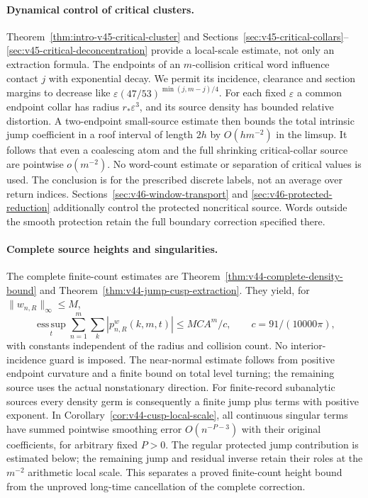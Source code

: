 \documentclass[11pt,reqno]{amsart}
\numberwithin{equation}{section}
\theoremstyle{definition}\newtheorem{definition}[theorem]{Definition}
\theoremstyle{remark}\newtheorem{remark}[theorem]{Remark}
\begin{document}
\paragraph{Dynamical control of critical clusters.}
Theorem~\ref{thm:intro-v45-critical-cluster} and
Sections~\ref{sec:v45-critical-collars}--\ref{sec:v45-critical-deconcentration}
provide a local-scale estimate, not only an extraction formula.
The endpoints of an $m$-collision critical word influence contact $j$
with exponential decay. We permit its incidence, clearance and section
margins to decrease like $\varepsilon(47/53)^{\min(j,m-j)/4}$.
For each fixed $\varepsilon$ a common endpoint collar has radius
$r_*\varepsilon^3$, and its source density has bounded relative
distortion. A two-endpoint small-source estimate then bounds the total
intrinsic jump coefficient in a roof interval of length $2h$ by
$O(hm^{-2})$ in the limsup. It follows that even a coalescing atom and
the full shrinking critical-collar source are pointwise $o(m^{-2})$.
No word-count estimate or separation of critical values is used. The
conclusion is for the prescribed discrete labels, not an average over
return indices. Sections~\ref{sec:v46-window-transport} and
\ref{sec:v46-protected-reduction} additionally control the protected
noncritical source. Words outside the smooth protection retain the
full boundary correction specified there.

\paragraph{Complete source heights and singularities.}
The complete finite-count estimates are Theorem~\ref{thm:v44-complete-density-bound}
and Theorem~\ref{thm:v44-jump-cusp-extraction}. They yield, for
$\|w_{n,R}\|_\infty\le M$,
\[
 \operatorname*{ess\,sup}_{t}\sum_{n=1}^m\sum_k
       |p^w_{n,R}(k,m,t)|\le MCA^m/c,
 \qquad c=91/(10000\pi),
\]
with constants independent of the radius and collision count. No
interior-incidence guard is imposed. The near-normal estimate follows
from positive endpoint curvature and a finite bound on total level
turning; the remaining source uses the actual nonstationary direction.
For finite-record subanalytic sources every density germ is consequently
a finite jump plus terms with positive exponent. In
Corollary~\ref{cor:v44-cusp-local-scale}, all continuous singular terms
have summed pointwise smoothing error $O(n^{-P-3})$ with their original
coefficients, for arbitrary fixed $P>0$. The regular protected jump contribution is estimated below; the
remaining jump and residual inverse retain their roles at the
$m^{-2}$ arithmetic local scale.
This separates a proved finite-count height bound from the unproved
long-time cancellation of the complete correction.
\end{document}
